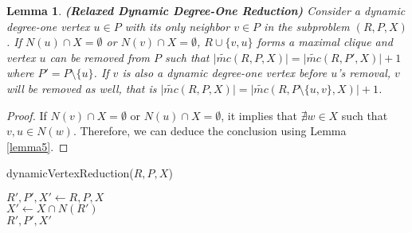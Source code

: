 \documentclass[sigconf, nonacm]{acmart}
\newtheorem{lem}[thm]{\bf Lemma}
\begin{document}
\begin{lem}{\textbf{(Relaxed Dynamic Degree-One Reduction)}}
\textit{
Consider a dynamic degree-one vertex $u\in P$ with its only neighbor $v\in P$ in the subproblem $(R,P,X)$. 
If $N(u) \cap X = \emptyset$ or $N(v) \cap X = \emptyset$, $R \cup \{v, u\}$ forms a maximal clique and vertex $u$ can be removed from $P$ such that $\lvert\tilde{mc}(R,P,X)\rvert=\lvert\tilde{mc}(R,P',X)\rvert + 1$ where $P'=P\setminus \{u\}$. If $v$ is also a dynamic degree-one vertex before $u$'s removal, $v$ will be removed as well, that is $\lvert\tilde{mc}(R,P,X)\rvert=\lvert\tilde{mc}(R,P\setminus \{u,v\},X)\rvert + 1$. \label{lemma6}}
\end{lem}
\begin{proof}
    If $N(v) \cap X = \emptyset$ or $N(u) \cap X = \emptyset$, it implies that $\nexists w \in X$ such that $v, u \in N(w)$. Therefore, we can deduce the %
    conclusion 
    using Lemma \ref{lemma5}.
\end{proof}

\begin{algorithm}[t]
    \SetNoFillComment
    \caption{dynamicVertexReduction($R,P,X$)}
    \label{alg:dynamicVertexReduction}
    \nl $R', P', X' \leftarrow R, P, X$ \\
    \nl {}
    \nl {}
    \nl {}
    \nl $X' \gets X\cap N(R')$ \\

  \nl \KwRet $R',P',X'$\\
\end{algorithm}
\end{document}
